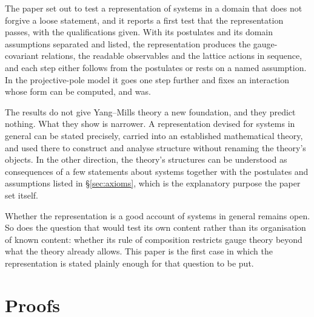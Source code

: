 \documentclass[11pt,a4paper]{article}
\theoremstyle{plain}
\theoremstyle{definition}
\theoremstyle{remark}
\begin{document}
The paper set out to test a representation of systems in a domain that does not forgive a loose statement, and it reports a first test that the representation passes, with the qualifications given. With its postulates and its domain assumptions separated and listed, the representation produces the gauge-covariant relations, the readable observables and the lattice actions in sequence, and each step either follows from the postulates or rests on a named assumption. In the projective-pole model it goes one step further and fixes an interaction whose form can be computed, and was.

The results do not give Yang--Mills theory a new foundation, and they predict nothing. What they show is narrower. A representation devised for systems in general can be stated precisely, carried into an established mathematical theory, and used there to construct and analyse structure without renaming the theory's objects. In the other direction, the theory's structures can be understood as consequences of a few statements about systems together with the postulates and assumptions listed in \S\ref{sec:axioms}, which is the explanatory purpose the paper set itself.

Whether the representation is a good account of systems in general remains open. So does the question that would test its own content rather than its organisation of known content: whether its rule of composition restricts gauge theory beyond what the theory already allows. This paper is the first case in which the representation is stated plainly enough for that question to be put.

\appendix

\clearpage
\section{Proofs}\label{app:proofs}
\end{document}
